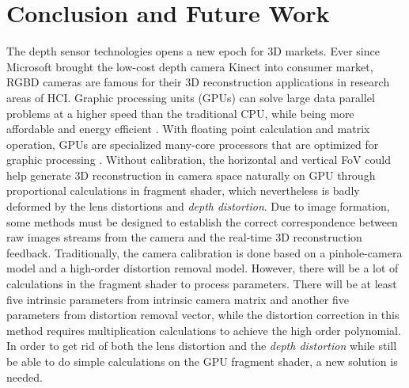 \chapter{Conclusion and Future Work} %
\label{chapterConclusionAndFutureWork} 
\indent
The depth sensor technologies opens a new epoch for \gls{3D} markets. Ever since Microsoft brought the low-cost depth camera Kinect into consumer market, \gls{RGBD} cameras are famous for their \gls{3D} reconstruction applications in research areas of \gls{HCI}. Graphic processing units (GPUs) can solve large data parallel problems at a higher speed than the traditional CPU, while being more affordable and energy efficient \cite{GPUadvantage_2015}. With floating point calculation and matrix operation, GPUs are specialized many-core processors that are optimized for graphic processing \cite{GPUadvantage02_2013}. Without calibration, the horizontal and vertical \gls{FoV} could help generate \gls{3D} reconstruction in camera space naturally on \gls{GPU} through proportional calculations in fragment shader, which nevertheless is badly deformed by the lens distortions and \emph{depth distortion}. Due to image formation, some methods must be designed to establish the correct correspondence between raw images streams from the camera and the real-time \gls{3D} reconstruction feedback. Traditionally, the camera calibration is done based on a pinhole-camera model and a high-order distortion removal model. However, there will be a lot of calculations in the fragment shader to process parameters. There will be at least five intrinsic parameters from intrinsic camera matrix and another five parameters from distortion removal vector, while the distortion correction in this method requires multiplication calculations to achieve the high order polynomial. In order to get rid of both the lens distortion and the \emph{depth distortion} while still be able to do simple calculations on the \gls{GPU} fragment shader, a new solution is needed. %
%
\\\indent
